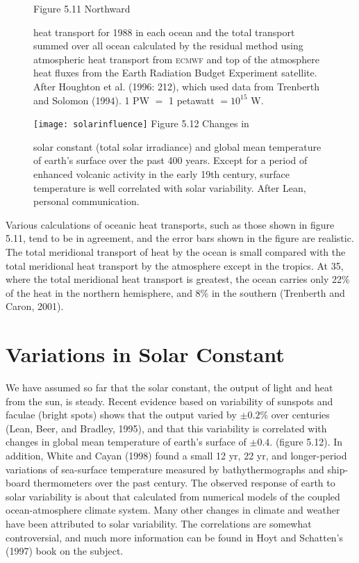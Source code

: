 \begin{figure}[t!]
\footnotesize
Figure 5.11 Northward \rule{0mm}{3ex}heat
transport for 1988 in each ocean and the total
transport summed over all ocean calculated by the residual method
using atmospheric heat transport from \textsc{ecmwf} and top of the
atmosphere heat fluxes from the Earth Radiation Budget Experiment
satellite. After Houghton et al. (1996: 212), which used data from
Trenberth and Solomon (1994). 1 PW $=$ 1 petawatt $= 10^{15}$ W.
\label{fig:heattransport}
\vspace{-4ex}
\end{figure}
\begin{figure}[b!]
\vspace{-5ex}
\texttt{[image: solarinfluence]}
\footnotesize
Figure 5.12 Changes in \rule{0mm}{3ex}solar constant (total solar irradiance) and global mean
temperature of earth's surface over the past 400 years. Except for a
period of enhanced volcanic activity in the early 19th century,
surface temperature is well correlated with solar variability. After
Lean, personal communication.
\label{fig:solarinfluence}
\end{figure}

Various calculations of oceanic heat transports,
such as those shown in figure 5.11, tend to be
in agreement, and the error bars shown in the figure are realistic.
The total meridional transport of heat by the ocean is small compared
with the total meridional heat transport by the atmosphere except in
the tropics. At 35\degrees, where the total meridional heat transport
is greatest, the ocean carries only 22\% of the heat in the northern
hemisphere, and 8\% in the southern (Trenberth and Caron, 2001).


\section{Variations in Solar Constant}
We have assumed so far that the
solar constant, the output of light and heat from the sun, is
steady. Recent evidence based on variability of sunspots and faculae
(bright spots) shows that the output varied by $\pm 0.2$\% over
centuries (Lean, Beer, and Bradley, 1995), and that this variability
is correlated with changes in global mean temperature of earth's
surface of $\pm 0.4$.  (figure 5.12). In addition, White
and Cayan (1998) found a small 12 yr, 22 yr, and longer-period
variations of sea-surface temperature measured by
bathythermographs and ship-board
thermometers over the past century. The observed response of earth to
solar variability is about that calculated from numerical models of
the coupled ocean-atmosphere climate system. Many other changes in
climate and weather have been attributed to solar variability. The
correlations are somewhat controversial, and much more information can
be found in Hoyt and Schatten's (1997) book on the subject.

